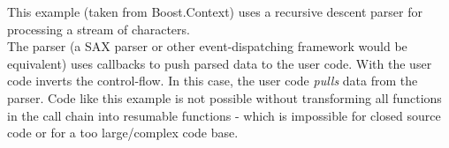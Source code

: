 \newpage
{}\label{appendix}
This example (taken from Boost.Context\cite{bcontext}) uses a recursive descent
parser for processing a stream of characters.\\
The parser (a SAX parser or other event-dispatching framework would be
equivalent) uses callbacks to push parsed data to the user code. With \ectx the
user code inverts the control-flow. In this case, the user code \emph{pulls}
data from the parser.
Code like this example is not possible without transforming all functions in the
call chain into resumable functions - which is impossible for closed source code
or for a too large/complex code base.
